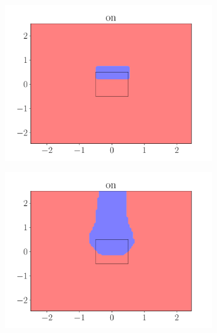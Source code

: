 \documentclass{beamer}
\begin{document}
\begin{frame}
\begin{figure}[ht]
\begin{subfigure}{0.45\textwidth}
            \centering
            \includegraphics[width=\textwidth]{figures/on_rule.pdf}
        \end{subfigure}
        \begin{subfigure}{0.45\textwidth}
            \centering
            \includegraphics[width=\textwidth]{figures/on_predicate_only.pdf}
        \end{subfigure}
    \end{figure}
\end{frame}
\end{document}

